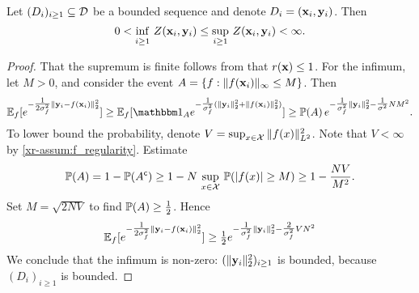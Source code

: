 \documentclass[12pt, twoside]{report}
\newcommand{\xrprefix}[1]{xr-#1}
\begin{document}
\begin{lemma} \label{lem:inf_sup_Z}
    Let $(D_i)_{i \ge 1} \sub \D$ be a bounded sequence and denote $D_i = (\vx_i, \vy_i)$.
    Then
    \begin{equation}
        0
        < \inf_{i \ge 1}\, Z(\vx_i, \vy_i)
        \le \sup_{i \ge 1}\, Z(\vx_i, \vy_i)
        < \infty.
    \end{equation}
\end{lemma}
\begin{proof}
    That the supremum is finite follows from that $r(\vx) \le 1$.
    For the infimum,
    let $M > 0$, and consider the event $A = \set{f : \norm{f(\vx_i)}_\infty \le M}$.
    Then
    \begin{equation}
        \E_f[e^{-\tfrac1{2\sigma_f^2}\norm{\vy_i - f(\vx_i)}_2^2}]
        \ge \E_f[\ind_A e^{-\tfrac1{\sigma_f^2}(\norm{\vy_i}_2^2 + \norm{f(\vx_i)}_2^2)}]
        \ge \P(A)\, e^{-\tfrac1{\sigma_f^2}\norm{\vy_i}_2^2 - \tfrac{1}{\sigma^2} N M^2}.
    \end{equation}
    To lower bound the probability, denote $V = \sup_{x \in \X}\, \norm{f(x)}^2_{L^2}$.
    Note that $V < \infty$ by \cref{\xrprefix{assum:f_regularity}}.
    Estimate
    \begin{equation}
        \P(A)
        = 1 - \P(A^\c) \vphantom{\sup_{x \in \X}}
        \ge 1 - \vphantom{\frac NN} N\,\sup_{x \in \X}\, \P(\abs{f(x)} \ge M)
        \ge 1 - \frac{N V}{M^2}.
    \end{equation}
    Set $M = \sqrt{2 N V}$ to find $\P(A) \ge \tfrac12$.
    Hence
    \begin{equation} \label{lem:inf_sup_Z:lower_bound}
        \E_f[e^{-\tfrac1{2\sigma_f^2}\norm{\vy_i - f(\vx_i)}_2^2}]
        \ge \tfrac12 e^{-\tfrac1{\sigma_f^2}\norm{\vy_i}_2^2 - \tfrac{2}{\sigma_f^2} VN^2}
    \end{equation}
    We conclude that the infimum is non-zero: $(\norm{\vy_i}^2_2)_{i \ge 1}$ is bounded, because $(D_i)_{i \ge 1}$ is bounded.
\end{proof}
\end{document}
